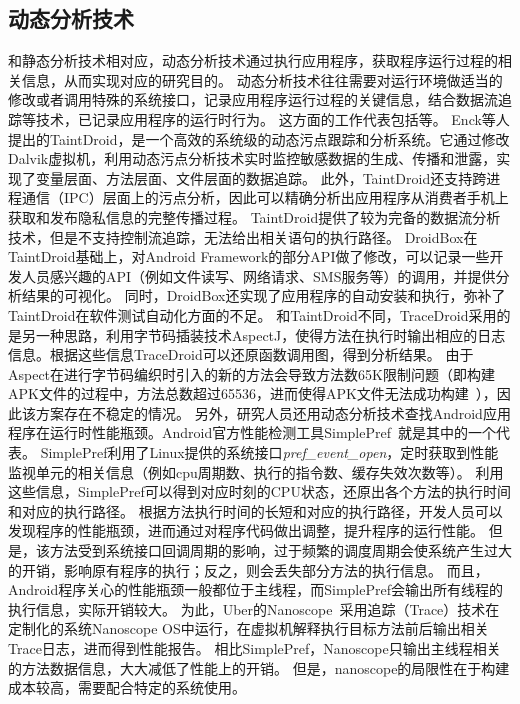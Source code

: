 \subsection{动态分析技术}

和静态分析技术相对应，动态分析技术通过执行应用程序，获取程序运行过程的相关信息，从而实现对应的研究目的。
动态分析技术往往需要对运行环境做适当的修改或者调用特殊的系统接口，记录应用程序运行过程的关键信息，结合数据流追踪等技术，已记录应用程序的运行时行为。
这方面的工作代表包括\cite{chun2014taintdroid,droidbox:online,van2013dynamic,droidscope}等。
Enck等人提出的TaintDroid\cite{chun2014taintdroid}，是一个高效的系统级的动态污点跟踪和分析系统。它通过修改Dalvik虚拟机，利用动态污点分析技术实时监控敏感数据的生成、传播和泄露，实现了变量层面、方法层面、文件层面的数据追踪。
此外，TaintDroid还支持跨进程通信（IPC）层面上的污点分析，因此可以精确分析出应用程序从消费者手机上获取和发布隐私信息的完整传播过程。
TaintDroid提供了较为完备的数据流分析技术，但是不支持控制流追踪，无法给出相关语句的执行路径。
DroidBox\cite{droidbox:online}在TaintDroid基础上，对Android Framework的部分API做了修改，可以记录一些开发人员感兴趣的API（例如文件读写、网络请求、SMS服务等）的调用，并提供分析结果的可视化。
同时，DroidBox还实现了应用程序的自动安装和执行，弥补了TaintDroid在软件测试自动化方面的不足。
和TaintDroid不同，TraceDroid\cite{van2013dynamic}采用的是另一种思路，利用字节码插装技术AspectJ，使得方法在执行时输出相应的日志信息。根据这些信息TraceDroid可以还原函数调用图，得到分析结果。
由于Aspect在进行字节码编织时引入的新的方法会导致方法数65K限制问题（即构建APK文件的过程中，方法总数超过65536，进而使得APK文件无法成功构建~\cite{Configur27}），因此该方案存在不稳定的情况。
\newline
另外，研究人员还用动态分析技术查找Android应用程序在运行时性能瓶颈。Android官方性能检测工具SimplePref~\cite{simpleperf:online}就是其中的一个代表。
SimplePref利用了Linux提供的系统接口\textit{pref\_event\_open}，定时获取到性能监视单元的相关信息（例如cpu周期数、执行的指令数、缓存失效次数等）。
利用这些信息，SimplePref可以得到对应时刻的CPU状态，还原出各个方法的执行时间和对应的执行路径。
根据方法执行时间的长短和对应的执行路径，开发人员可以发现程序的性能瓶颈，进而通过对程序代码做出调整，提升程序的运行性能。
但是，该方法受到系统接口回调周期的影响，过于频繁的调度周期会使系统产生过大的开销，影响原有程序的执行；反之，则会丢失部分方法的执行信息。
而且，Android程序关心的性能瓶颈一般都位于主线程，而SimplePref会输出所有线程的执行信息，实际开销较大。
为此，Uber的Nanoscope~\cite{ubernanoscope:online}采用追踪（Trace）技术在定制化的系统Nanoscope OS中运行，在虚拟机解释执行目标方法前后输出相关Trace日志，进而得到性能报告。
相比SimplePref，Nanoscope只输出主线程相关的方法数据信息，大大减低了性能上的开销。
但是，nanoscope的局限性在于构建成本较高，需要配合特定的系统使用。




